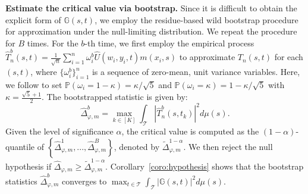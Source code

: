 \documentclass[
  12pt]{article}
\def\wt{\widetilde}
\def\wh{\widehat}
\def\mG{\mathbb{G}}
\def\mP{\mathbb{P}}
\def\cT{\mathcal{T}}
\begin{document}
\textbf{Estimate the critical value via bootstrap.} Since it is difficult to obtain the explicit form of $\mG(s,t)$, we employ the residue-based wild bootstrap procedure for approximation under the null-limiting distribution. We repeat the procedure for $B$ times. For the $b$-th time, we first employ the empirical process $\wh{T}^b_n(s,t) = \frac{1}{\sqrt{n}} \sum_{i=1}^n \omega^b_i \wh{U}(w_i,y_i,t)m(x_i,s)$ to approximate $T_n(s,t)$ for each $(s,t)$, where $\{\omega^b_i\}_{i=1}^n$ is a sequence of zero-mean, unit variance variables. Here, we follow \cite{enno1993} to set 
$\mP(\omega_i = 1- \kappa) = \kappa/\sqrt{5}$ and $\mP(\omega_i = \kappa) = 1-\kappa/\sqrt{5}$ with $\kappa = \frac{\sqrt{5}+1}{2}$. The bootstrapped statistic is given by:
\begin{equation}
\label{eq.bootstrap}
    \wh{\Delta}^b_{\varphi,m} = \max_{k\in [K]} \int_{\cT} |\wh{T}^b_n(s,t_k)|^2d\mu(s). 
\end{equation}
Given the level of significance $\alpha$, the critical value is computed as the $(1-\alpha)$-quantile of $\left\{\wh{\Delta}^1_{\varphi,m},...,\wh{\Delta}^B_{\varphi,m}\right\}$, denoted by $\wt{\Delta}^{1-\alpha}_{\varphi,m}$. We then reject the null hypothesis if $\wh{\Delta}_{\varphi,m} \geq \wt{\Delta}^{1-\alpha}_{\varphi,m}$. Corollary~\ref{coro:hypothesis} shows that the bootstrap statistics $\wh{\Delta}^b_{\varphi,m}$ converges to $\max_{t \in \cT} \int_{\cT}  |\mG(s,t)|^2 d\mu(s)$. 
\end{document}
